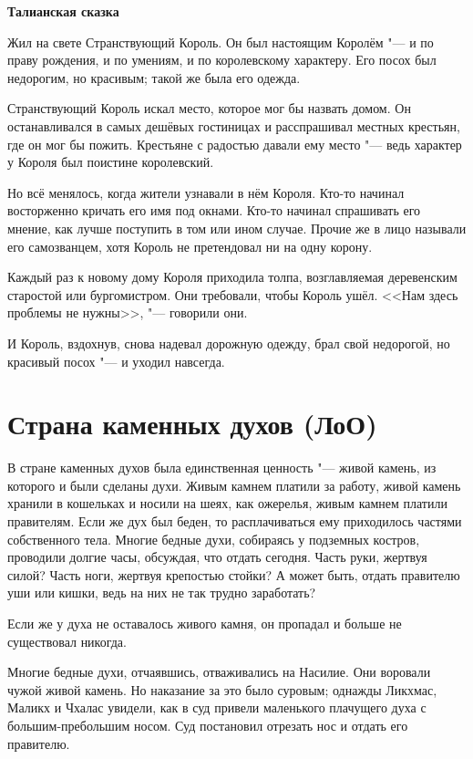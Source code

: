 \textbf{Талианская сказка}

Жил на свете Странствующий Король.
Он был настоящим Королём "--- и по праву рождения, и по умениям, и по королевскому характеру.
Его посох был недорогим, но красивым;
такой же была его одежда.

Странствующий Король искал место, которое мог бы назвать домом.
Он останавливался в самых дешёвых гостиницах и расспрашивал местных крестьян, где он мог бы пожить.
Крестьяне с радостью давали ему место "--- ведь характер у Короля был поистине королевский.

Но всё менялось, когда жители узнавали в нём Короля.
Кто-то начинал восторженно кричать его имя под окнами.
Кто-то начинал спрашивать его мнение, как лучше поступить в том или ином случае.
Прочие же в лицо называли его самозванцем, хотя Король не претендовал ни на одну корону.

Каждый раз к новому дому Короля приходила толпа, возглавляемая деревенским старостой или бургомистром.
Они требовали, чтобы Король ушёл.
<<Нам здесь проблемы не нужны>>, "--- говорили они.

И Король, вздохнув, снова надевал дорожную одежду, брал свой недорогой, но красивый посох "--- и уходил навсегда.

\section{Страна каменных духов (ЛоО)}

В стране каменных духов была единственная ценность "--- живой камень, из которого и были сделаны духи.
Живым камнем платили за работу, живой камень хранили в кошельках и носили на шеях, как ожерелья, живым камнем платили правителям.
Если же дух был беден, то расплачиваться ему приходилось частями собственного тела.
Многие бедные духи, собираясь у подземных костров, проводили долгие часы, обсуждая, что отдать сегодня.
Часть руки, жертвуя силой?
Часть ноги, жертвуя крепостью стойки?
А может быть, отдать правителю уши или кишки, ведь на них не так трудно заработать?

Если же у духа не оставалось живого камня, он пропадал и больше не существовал никогда.

Многие бедные духи, отчаявшись, отваживались на Насилие.
Они воровали чужой живой камень.
Но наказание за это было суровым;
однажды Ликхмас, Маликх и Чхалас увидели, как в суд привели маленького плачущего духа с большим-пребольшим носом.
Суд постановил отрезать нос и отдать его правителю.

